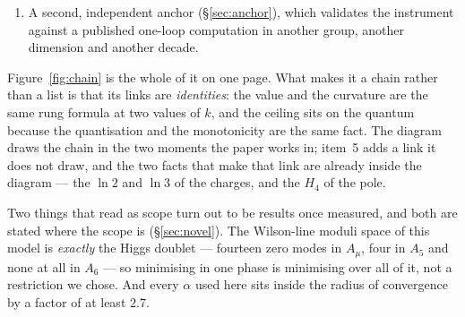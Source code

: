 \documentclass[11pt,a4paper]{article}
\begin{document}
\begin{enumerate}
being stated for a colour-singlet one, do not \emph{directly} constrain --- the data behind them
do, which is why what follows is a recast and not a rescaling. So it is
computed here rather than borrowed: the tower's spacelike form factor, folded with parton
densities and confronted with \cite{CMSangular}'s unfolded distribution and published covariance,
gives $1/R_5>10.86$~TeV --- numerically above the ceiling of item~5, so the two calculations
already cross; promoting the second to an experimental lower bound requires the detector-level
likelihood, which is why the word \emph{exclusion} is withheld for a reason \S\ref{sec:collider}
states and measures rather than waves at. The
dictionary itself is assembled from results of others and credited as such; what is ours is that a
ceiling stands over it, and a lower bound alone could never have closed the class.
\item A second, independent anchor (\S\ref{sec:anchor}), which validates the instrument against a
published one-loop computation in another group, another dimension and another decade.
\end{enumerate}

Figure~\ref{fig:chain} is the whole of it on one page. What makes it a chain rather than a list is
that its links are \emph{identities}: the value and the curvature are the same rung formula at two
values of $k$, and the ceiling sits on the quantum because the quantisation and the monotonicity are
the same fact. The diagram draws the chain in the two moments the paper works in; item~5 adds a
link it does not draw, and the two facts that make that link are already inside the diagram --- the
$\ln2$ and $\ln3$ of the charges, and the $H_4$ of the pole.

Two things that read as scope turn out to be results once measured, and both are stated where the
scope is (\S\ref{sec:novel}). The Wilson-line moduli space of this model is \emph{exactly} the Higgs
doublet --- fourteen zero modes in $A_\mu$, four in $A_5$ and none at all in $A_6$ --- so minimising
in one phase is minimising over all of it, not a restriction we chose. And every $\alpha$ used here
sits inside the radius of convergence by a factor of at least $2.7$.
\end{document}
